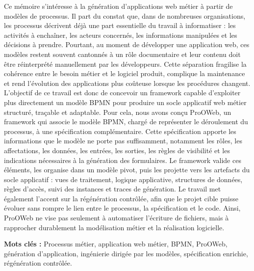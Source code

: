 \let\oldprintchaptertitle=\printchaptertitle
\renewcommand{\printchaptertitle}[1]{%
	\vspace*{-75pt}
	\oldprintchaptertitle{#1}
}%
\let\printchaptertitle=\oldprintchaptertitle


Ce mémoire s'intéresse à la génération d'applications web métier à partir de modèles de processus. Il part du constat que, dans de nombreuses organisations, les processus décrivent déjà une part essentielle du travail à informatiser : les activités à enchaîner, les acteurs concernés, les informations manipulées et les décisions à prendre. Pourtant, au moment de développer une application web, ces modèles restent souvent cantonnés à un rôle documentaire et leur contenu doit être réinterprété manuellement par les développeurs. Cette séparation fragilise la cohérence entre le besoin métier et le logiciel produit, complique la maintenance et rend l'évolution des applications plus coûteuse lorsque les procédures changent. L'objectif de ce travail est donc de concevoir un framework capable d'exploiter plus directement un modèle BPMN pour produire un socle applicatif web métier structuré, traçable et adaptable. Pour cela, nous avons conçu ProOWeb, un framework qui associe le modèle BPMN, chargé de représenter le déroulement du processus, à une spécification complémentaire. Cette spécification apporte les informations que le modèle ne porte pas suffisamment, notamment les rôles, les affectations, les données, les entrées, les sorties, les règles de visibilité et les indications nécessaires à la génération des formulaires. Le framework valide ces éléments, les organise dans un modèle pivot, puis les projette vers les artefacts du socle applicatif : vues de traitement, logique applicative, structures de données, règles d'accès, suivi des instances et traces de génération. Le travail met également l'accent sur la régénération contrôlée, afin que le projet cible puisse évoluer sans rompre le lien entre le processus, la spécification et le code. Ainsi, ProOWeb ne vise pas seulement à automatiser l'écriture de fichiers, mais à rapprocher durablement la modélisation métier et la réalisation logicielle.

\vspace{0.8cm}

\noindent\textbf{Mots clés :} Processus métier, application web métier, BPMN, ProOWeb, génération d'application, ingénierie dirigée par les modèles, spécification enrichie, régénération contrôlée.

\myCleanStarChapterEnd
